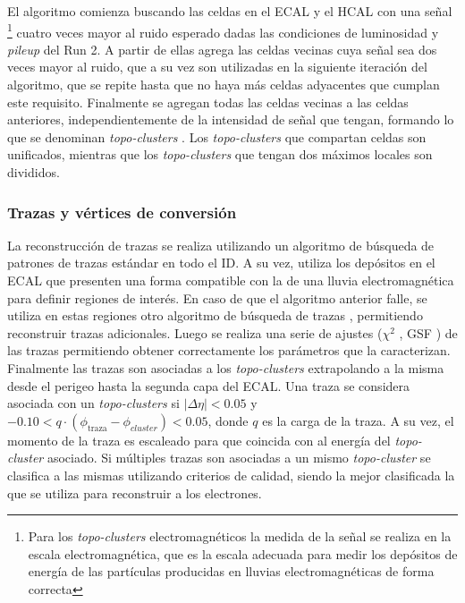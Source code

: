El algoritmo comienza buscando las celdas en el ECAL y el HCAL con una señal \footnote{Para los \textit{topo-clusters} electromagnéticos la medida de la señal se realiza en la escala electromagnética, que es la escala adecuada para medir los depósitos de energía de las partículas producidas en lluvias electromagnéticas de forma correcta} cuatro veces mayor al ruido esperado dadas las condiciones de luminosidad y \textit{pileup} del Run 2. A partir de ellas agrega las celdas vecinas cuya señal sea dos veces mayor al ruido, que a su vez son utilizadas en la siguiente iteración del algoritmo, que se repite hasta que no haya más celdas adyacentes que cumplan este requisito. Finalmente se agregan todas las celdas vecinas a las celdas anteriores, independientemente de la intensidad de señal que tengan, formando lo que se denominan \textit{topo-clusters} \cite{PERF-2014-07, Lampl:1099735}. Los \textit{topo-clusters} que compartan celdas son unificados, mientras que los \textit{topo-clusters} que tengan dos máximos locales son divididos.


\subsubsection{Trazas y vértices de conversión}

La reconstrucción de trazas se realiza utilizando un algoritmo de búsqueda de patrones de trazas estándar \cite{newt, PERF-2017-02, PERF-2017-01} en todo el ID. A su vez, utiliza los depósitos en el ECAL que presenten una forma compatible con la de una lluvia electromagnética para definir regiones de interés. En caso de que el algoritmo anterior falle, se utiliza en estas regiones otro algoritmo de búsqueda de trazas \cite{Kalman}, permitiendo reconstruir trazas adicionales. Luego se realiza una serie de ajustes ($\chi^2$ \cite{chi2}, GSF \cite{gsf}) de las trazas permitiendo obtener correctamente los parámetros que la caracterizan. Finalmente las trazas son asociadas a los \textit{topo-clusters} extrapolando a la misma desde el perigeo hasta la segunda capa del ECAL. Una traza se considera asociada con un \textit{topo-clusters} si $|\Delta\eta|<0.05$ y $-0.10<q\cdot(\phi_{\text{traza}}-\phi_{cluster})<0.05$, donde $q$ es la carga de la traza. A su vez, el momento de la traza es escaleado para que coincida con al energía del \textit{topo-cluster} asociado. Si múltiples trazas son asociadas a un mismo \textit{topo-cluster} se clasifica a las mismas utilizando criterios de calidad, siendo la mejor clasificada la que se utiliza para reconstruir a los electrones. 

